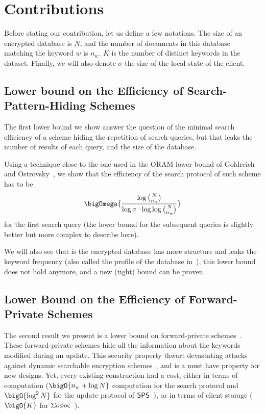 

\section{Contributions} %
\label{sec:contributions}

Before stating our contribution, let us define a few notations.
The size of an encrypted database is $N$, and the number of documents in this database matching the keyword $w$ is $n_w$.
$K$ is the number of distinct keywords in the dataset. 
Finally, we will also denote $\sigma$ the size of the local state of the client. 


\subsection{Lower bound on the Efficiency of Search-Pattern-Hiding Schemes} %
\label{sub:search_pat_lb}

The first lower bound we show answer the question of the minimal search efficiency of a scheme hiding the repetition of search queries, but that leaks the number of results of each query, and the size of the database.

Using a technique close to the one used in the ORAM lower bound of Goldreich and Ostrovsky~\cite{JACM:GO96}, we show that the efficiency of the search protocol of such scheme has to be 
\[
		\bigOmega{\frac{\log \binom{N}{n_w}}{\log \sigma \cdot \log \log  \binom{N}{n_w}}}
\]
for the first search query (the lower bound for the subsequent queries is slightly better but more complex to describe here).


We will also see that is the encrypted database has more structure and leaks the keyword frequency (also called the profile of the database in~\cite{EC:CasTes14}), this lower bound does not hold anymore, and a new (tight) bound can be proven.



\subsection{Lower Bound on the Efficiency of Forward-Private Schemes} %
\label{sub:fp_lb}

The second result we present is a lower bound on forward-private schemes~\cite{NDSS:StePapShi14,CCS:Bost16}.
These forward-private schemes hide all the information about the keywords modified during an update.
This security property thwart devastating attacks against dynamic searchable encryption schemes~\cite{USENIX:ZhaKatPap16}, and is a must have property for new designs.
Yet, every existing construction had a cost, either in terms of computation ($\bigO{n_w + \log N}$ computation for the search protocol and $\bigO{\log^2 N}$ for the update protocol of $\mathsf{SPS}$~\cite{NDSS:StePapShi14}), or in terms of client storage ($\bigO{K}$ for ${\Sigma o\phi o\varsigma}$~\cite{CCS:Bost16}).

